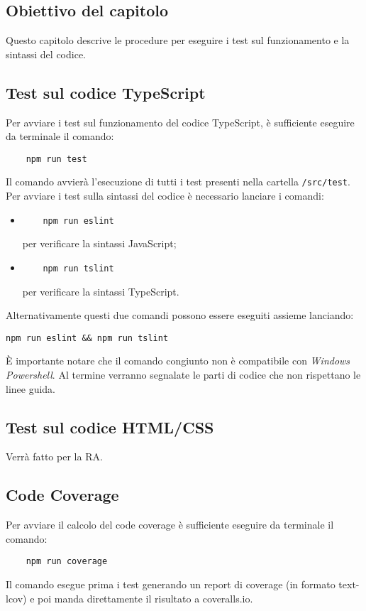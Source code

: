 \subsection{Obiettivo del capitolo}
Questo capitolo descrive le procedure per eseguire i test sul funzionamento e la sintassi del codice.
\subsection{Test sul codice TypeScript}
Per avviare i test sul funzionamento del codice TypeScript, è sufficiente eseguire da terminale il comando:
\begin{verbatim}
	npm run test
\end{verbatim}
Il comando avvierà l'esecuzione di tutti i test presenti nella cartella \texttt{/src/test}.
Per avviare i test sulla sintassi del codice è necessario lanciare i comandi:
\begin{itemize}
	\item \begin{verbatim}
	npm run eslint
	\end{verbatim} per verificare la sintassi JavaScript;
	\item \begin{verbatim}
	npm run tslint
	\end{verbatim}
	per verificare la sintassi TypeScript.
\end{itemize}
Alternativamente questi due comandi possono essere eseguiti assieme lanciando:
\begin{verbatim}
npm run eslint && npm run tslint
\end{verbatim}
È importante notare che il comando congiunto non è compatibile con \emph{Windows Powershell}.
Al termine verranno segnalate le parti di codice che non rispettano le linee guida.

\subsection{Test sul codice HTML/CSS}
Verrà fatto per la RA.
\subsection{Code Coverage}
Per avviare il calcolo del code coverage è sufficiente eseguire da terminale il comando:
\begin{verbatim}
	npm run coverage
\end{verbatim}
Il comando esegue prima i test generando un report di coverage (in formato text-lcov) e poi manda direttamente il risultato a coveralls.io.